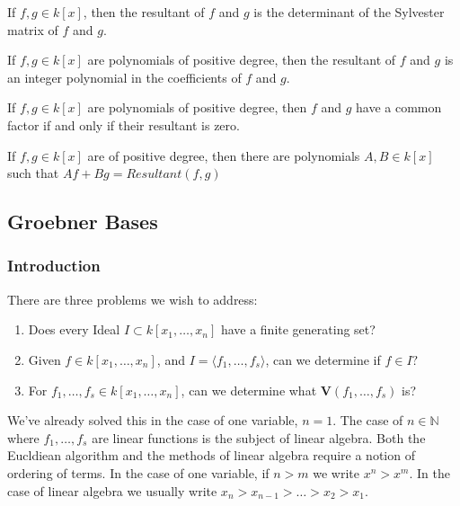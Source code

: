 \documentclass[crop=false,class=article,oneside]{standalone}
\begin{document}
            \begin{theorem}
            If $f,g \in k[x]$, then the resultant of $f$ and $g$ is the determinant of the Sylvester matrix of $f$ and $g$.
            \end{theorem}
            \begin{theorem}
            If $f,g\in k[x]$ are polynomials of positive degree, then the resultant of $f$ and $g$ is an integer polynomial in the coefficients of $f$ and $g$.
            \end{theorem}
            \begin{theorem}
            If $f,g\in k[x]$ are polynomials of positive degree, then $f$ and $g$ have a common factor if and only if their resultant is zero.
            \end{theorem}
            \begin{theorem}
            If $f,g\in k[x]$ are of positive degree, then there are polynomials $A,B \in k[x]$ such that $Af + Bg = Resultant(f,g)$
            \end{theorem}
    \subsection{Groebner Bases}
        \subsubsection{Introduction}
            There are three problems we wish to address:
            \begin{enumerate}
                \item Does every Ideal
                      $I\subset k[x_1,\hdots ,x_n]$
                      have a finite generating set?
                \item Given $f\in k[x_1,\hdots ,x_n]$,
                      and $I=\langle f_1,\hdots, f_s\rangle$,
                      can we determine if $f\in I?$
                \item For $f_1,\hdots,f_{s}\in{k}[x_{1},\hdots,x_{n}]$,
                      can we determine what
                      $\mathbf{V}(f_1,\hdots, f_s)$ is?
            \end{enumerate}
            We've already solved this in the case of one
            variable, $n=1$. The case of $n\in\mathbb{N}$
            where $f_1,\hdots,f_s$ are linear functions is the
            subject of linear algebra. Both the Eucldiean
            algorithm and the methods of linear algebra require
            a notion of ordering of terms. In the case of one
            variable, if $n>m$ we write $x^n>x^m$. In the case of
            linear algebra we usually write
            $x_n>x_{n-1}>\hdots>x_{2}>x_{1}$. 
\end{document}
